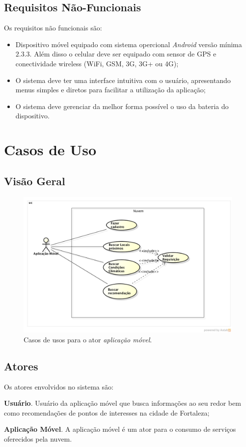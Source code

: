 \documentclass[11pt,a4paper,oneside]{article}
\begin{document}
\subsection{Requisitos Não-Funcionais}
Os requisitos não funcionais são:
\begin{itemize}
\item Dispositivo móvel equipado com sistema opercional \emph{Android} versão mínima $2.3.3$. Além disso o celular deve ser equipado com sensor de GPS e conectividade wireless (WiFi, GSM, 3G, 3G+ ou 4G);
\item O sistema deve ter uma interface intuitiva com o usuário, apresentando menus simples e diretos para facilitar a utilização da aplicação;
\item O sistema deve gerenciar da melhor forma possível o uso da bateria do dispositivo.
\end{itemize}

\section{Casos de Uso}
\subsection{Visão Geral}

\begin{figure}
\centering
\includegraphics[scale=0.5]{../casos-de-usos/casos-de-usos-app-servidor.png}
\caption{Casos de usos para o ator \emph{aplicação móvel}.}
\label{fig:casos-de-usos-app-servidor}
\end{figure}

\subsection{Atores}
Os atores envolvidos no sistema são:
\begin{description}
\item \textbf{Usuário}. Usuário da aplicação móvel que busca informações ao seu redor bem como recomendações de pontos de interesses na cidade de Fortaleza;
\item \textbf{Aplicação Móvel}. A aplicação móvel é um ator para o consumo de serviços oferecidos pela nuvem.
\end{description}
\end{document}
